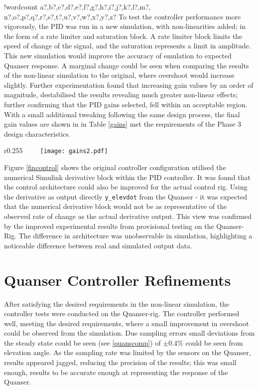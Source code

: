 \documentclass[11pt]{article}
\newcounter{words}
\newenvironment{counted}{%
  \setcounter{words}{0}
  \SearchList!{wordcount}{\stepcounter{words}}
    {a?,b?,c?,d?,e?,f?,g?,h?,i?,j?,k?,l?,m?,
    n?,o?,p?,q?,r?,s?,t?,u?,v?,w?,x?,y?,z?}
  \UndoBoundary{'}
  \SearchOrder{p;}}{%
  \StopSearching}
\begin{document}
\begin{counted}
To test the controller performance more vigorously, the PID was run in a
new simulation, with non-linearities added; in the form of a rate
limiter and saturation block. A rate limiter block limits the speed of
change of the signal, and the saturation represents a limit in
amplitude. This new simulation would improve the accuracy of emulation
to expected Quanser response. A marginal change could be seen when
comparing the results of the non-linear simulation to the original,
where overshoot would increase slightly. Further experimentation found
that increasing gain values by an order of magnitude, destabilised the
results revealing much greater non-linear effects; further confirming
that the PID gains selected, fell within an acceptable region. With a
small additional tweaking following the same design process, the final
gain values are shown in in Table \ref{gains} met the requirements of
the Phase 3 design characteristics.

\begin{wrapfigure}{r}{0.255\textwidth}
\vspace{-30pt}
 \centering
 \texttt{[image: gains2.pdf]}
 \label{gains}
\vspace{-20pt}
 \end{wrapfigure}

Figure \ref{fincontrol} shows the original controller configuration
utilised the numerical Simulink derivative block within the PID
controller. It was found that the control architecture could also be
improved for the actual control rig. Using the derivative as output
directly \texttt{y\_elevdot} from the Quanser - it was expected that the
numerical derivative block would not be as representative of the
observed rate of change as the actual derivative output. This view was
confirmed by the improved experimental results from provisional testing
on the Quanser-Rig. The difference in architecture was unobservable in
simulation, highlighting a noticeable difference between real and
simulated output data.

\section{Quanser Controller
Refinements}\label{quanser-controller-refinements}

After satisfying the desired requirements in the non-linear simulation,
the controller tests were conducted on the Quanser-rig. The controller
performed well, meeting the desired requirements, where a small
improvement in overshoot could be observed from the simulation. Due
sampling errors small deviations from the steady state could be seen
(see \ref{quanscomp}) of \(\pm 0.4\)\% could be seen from elevation
angle. As the sampling rate was limited by the sensors on the Quanser,
results appeared jagged, reducing the precision of the results; this was
small enough, results to be accurate enough at representing the response
of the Quanser.


\end{counted}
\end{document}
